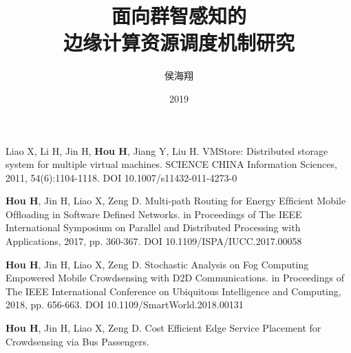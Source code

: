 \documentclass[format=draft,language=chinese,degree=phd,table,usenames,dvipsnames]{hustthesis}
\title{面向群智感知的\\边缘计算资源调度机制研究}{Resources Scheduling Mechanisms in Edge Computing for Mobile Crowdsensing}
\author{侯海翔}{Haixiang Hou}
\date{2019}{5}{26}
\begin{document}
\frontmatter
\maketitle
\makeabstract
\tableofcontents
\mainmatter













\begin{ack}


\end{ack}



\appendix


\begin{publications}
\item Liao X, Li H, Jin H, \textbf{Hou H}, Jiang Y, Liu H. VMStore: Distributed storage system for multiple virtual machines. SCIENCE CHINA Information Sciences, 2011, 54(6):1104-1118. DOI 10.1007/s11432-011-4273-0
\item \textbf{Hou H}, Jin H, Liao X, Zeng D. Multi-path Routing for Energy Efﬁcient Mobile Ofﬂoading in Software Deﬁned Networks. in Proceedings of The IEEE International Symposium on Parallel and Distributed Processing with Applications, 2017, pp. 360-367. DOI 10.1109/ISPA/IUCC.2017.00058
\item \textbf{Hou H}, Jin H, Liao X, Zeng D. Stochastic Analysis on Fog Computing Empowered Mobile Crowdsensing with D2D Communications. in Proceedings of The IEEE International Conference on Ubiquitous Intelligence and Computing, 2018, pp. 656-663. DOI 10.1109/SmartWorld.2018.00131
\item \textbf{Hou H}, Jin H, Liao X, Zeng D. Cost Efficient Edge Service Placement for Crowdsensing via Bus Passengers.
\end{publications}
\end{document}

